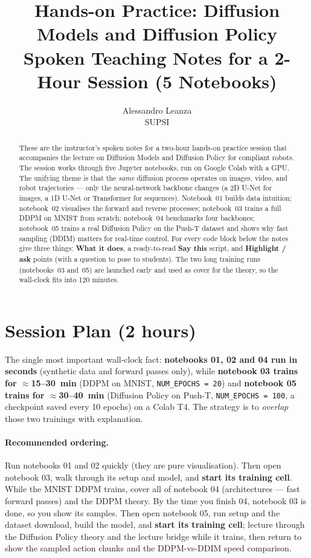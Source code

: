 \documentclass[11pt]{article}
\title{\textbf{Hands-on Practice: Diffusion Models and Diffusion Policy}\\[0.3em]
\large Spoken Teaching Notes for a 2-Hour Session (5 Notebooks)}
\author{Alessandro Leanza \\ \small SUPSI}
\date{}
\begin{document}
\maketitle

\begin{abstract}
\noindent
These are the instructor's spoken notes for a two-hour hands-on practice session that
accompanies the lecture on Diffusion Models and Diffusion Policy for compliant robots.
The session works through five Jupyter notebooks, run on Google Colab with a GPU.
The unifying theme is that the \emph{same} diffusion process operates on images, video, and
robot trajectories --- only the neural-network backbone changes (a 2D U-Net for images, a 1D
U-Net or Transformer for sequences). Notebook~01 builds data intuition; notebook~02 visualises
the forward and reverse processes; notebook~03 trains a full DDPM on MNIST from scratch;
notebook~04 benchmarks four backbones; notebook~05 trains a real Diffusion Policy on the Push-T
dataset and shows why fast sampling (DDIM) matters for real-time control. For every code block
below the notes give three things: \textbf{What it does}, a ready-to-read \textbf{Say this} script,
and \textbf{Highlight / ask} points (with a question to pose to students). The two long training
runs (notebooks~03 and~05) are launched early and used as cover for the theory, so the wall-clock
fits into 120 minutes.
\end{abstract}

\tableofcontents
\bigskip

\section{Session Plan (2 hours)}

The single most important wall-clock fact: \textbf{notebooks 01, 02 and 04 run in seconds}
(synthetic data and forward passes only), while \textbf{notebook 03 trains for $\approx$15--30~min}
(DDPM on MNIST, \texttt{NUM\_EPOCHS = 20}) and \textbf{notebook 05 trains for $\approx$30--40~min}
(Diffusion Policy on Push-T, \texttt{NUM\_EPOCHS = 100}, a checkpoint saved every 10 epochs) on a
Colab T4. The strategy is to \emph{overlap} those two trainings with explanation.

\paragraph{Recommended ordering.} Run notebooks 01 and 02 quickly (they are pure visualisation).
Then open notebook 03, walk through its setup and model, and \textbf{start its training cell}.
While the MNIST DDPM trains, cover all of notebook 04 (architectures --- fast forward passes) and
the DDPM theory. By the time you finish 04, notebook 03 is done, so you show its samples. Then
open notebook 05, run setup and the dataset download, build the model, and \textbf{start its
training cell}; lecture through the Diffusion Policy theory and the lecture bridge while it trains,
then return to show the sampled action chunks and the DDPM-vs-DDIM speed comparison.
\end{document}
